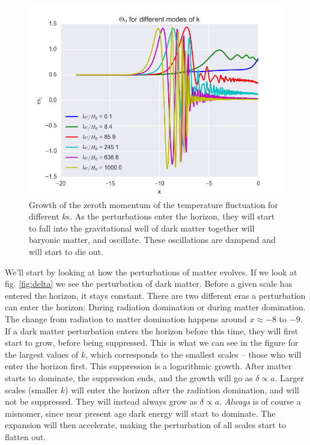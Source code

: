 \documentclass[a4paper,norsk, 10pt]{article}
\begin{document}
\begin{figure}[!htbp]
\centering
\includegraphics[scale=0.5]{Theta_0.png}
\caption{Growth of the zeroth momentum of the temperature fluctuation for different $k$s. As the perturbations enter the horizon, they will start to fall into the gravitational well of dark matter together will baryonic matter, and oscillate. These oscillations are dampend and will start to die out.}\label{fig:theta}
\end{figure}




We'll start by looking at how the perturbations of matter evolves. If we look at fig. \ref{fig:delta} we see the perturbation of dark matter. Before a given scale has entered the horizon, it stays constant. There are two different eras a perturbation can enter the horizon: During radiation domination or during matter domination. The change from radiation to matter domination happens around $x\approx -8$ to $-9$. If a dark matter perturbation enters the horizon before this time, they will first start to grow, before being suppressed. This is what we can see in the figure for the largest values of $k$, which corresponds to the smallest scales -- those who will enter the horizon first. This suppression is a logarithmic growth. After matter starts to dominate, the suppression ends, and the growth will go as $\delta \propto a$. Larger scales (smaller $k$) will enter the horizon after the radiation domination, and will not be suppressed. They will instead always grow as $\delta \propto a$. \textit{Always} is of course a misnomer, since near present age dark energy will start to dominate. The expansion will then accelerate, making the perturbation of all scales start to flatten out. 
\end{document}
